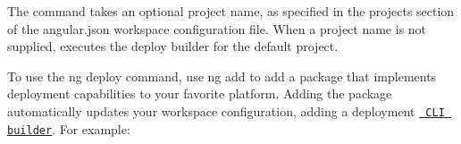 The command takes an optional project name, as specified in the {\ttfamily projects} section of the {\ttfamily angular.\+json} workspace configuration file. When a project name is not supplied, executes the {\ttfamily deploy} builder for the default project.

To use the {\ttfamily ng deploy} command, use {\ttfamily ng add} to add a package that implements deployment capabilities to your favorite platform. Adding the package automatically updates your workspace configuration, adding a deployment \href{guide/cli-builder}{\texttt{ CLI builder}}. For example\+:


\begin{DoxyCode}{0}
\DoxyCodeLine{      \}}
\DoxyCodeLine{    \}}
\DoxyCodeLine{  \}}
\DoxyCodeLine{\}}

\end{DoxyCode}
 